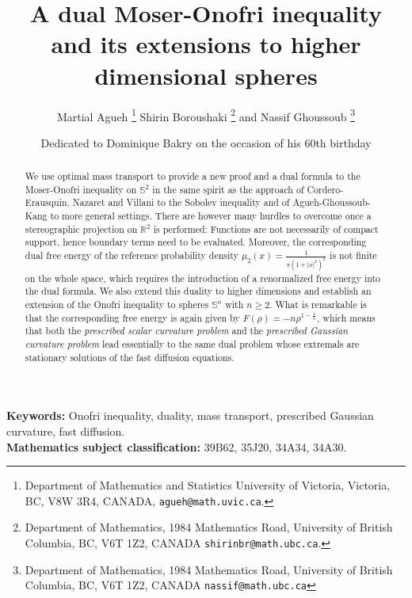 \documentclass[10pt]{article}
\title{A dual Moser-Onofri inequality and its extensions to higher dimensional spheres}
\author {Martial Agueh \thanks{\scriptsize  Department of Mathematics and Statistics
University of Victoria, Victoria, BC, V8W 3R4, CANADA,  \texttt{agueh@math.uvic.ca}.} \; 
Shirin Boroushaki  \thanks{\scriptsize  Department of Mathematics, 1984 Mathematics Road,
University of British Columbia, BC, V6T 1Z2, CANADA
  \texttt{shirinbr@math.ubc.ca}.}\; 
 and Nassif Ghoussoub \thanks{\scriptsize Department of Mathematics, 1984 Mathematics Road,
  University of British Columbia, BC, V6T 1Z2, CANADA
\texttt{nassif@math.ubc.ca}}
}
\date{\footnotesize Dedicated to Dominique Bakry on the occasion of his 60th birthday}
\numberwithin{equation}{section}
\theoremstyle{plain}
\theoremstyle{definition}
\theoremstyle{remark}
\newcommand\R{{\mathbb R}}
\newcommand\s{{\mathbb S}}
\begin{document}
\maketitle

\begin{abstract} We use optimal mass transport to provide a new proof and a dual formula to the Moser-Onofri inequality on $\s^2$ in the same spirit as the approach of Cordero-Erausquin, Nazaret and Villani \cite{CNV} to the Sobolev inequality and of  Agueh-Ghoussoub-Kang \cite{AGK} to more general settings. There are however many hurdles to overcome once a stereographic projection on $\R^2$ is performed:  Functions are not necessarily of compact support, hence boundary terms need to be evaluated. Moreover, the corresponding dual  free energy of the reference probability density $\mu_2(x)=\frac{1}{\pi(1+|x|^2)^2}$ is not finite on the whole space, which requires the introduction of a renormalized free energy into the dual formula.  We also extend this duality to higher dimensions and establish an extension of the Onofri inequality to spheres $\s^n$ with $n\geq 2$. What is remarkable is that the corresponding free energy is again given by $F(\rho)=-n\rho^{1-\frac{1}{n}}$, which means that both the {\it prescribed scalar curvature problem} and the {\it prescribed Gaussian curvature problem} lead essentially to the same dual problem whose extremals are stationary solutions of the fast diffusion equations.  

\end{abstract}

\textbf{Keywords:} Onofri inequality, duality, mass transport, prescribed Gaussian curvature, fast diffusion.\\

\textbf{Mathematics subject classification:} 39B62, 35J20, 34A34, 34A30.

\end{document}
